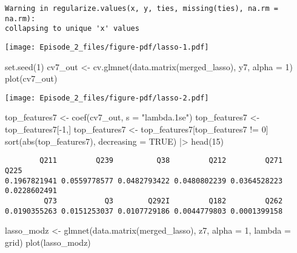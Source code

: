 \documentclass[
  letterpaper,
  DIV=11,
  numbers=noendperiod]{scrartcl}
\newenvironment{Shaded}{\begin{snugshade}}{\end{snugshade}}
\newcommand{\AttributeTok}[1]{\textcolor[rgb]{0.40,0.45,0.13}{#1}}
\newcommand{\ConstantTok}[1]{\textcolor[rgb]{0.56,0.35,0.01}{#1}}
\newcommand{\DecValTok}[1]{\textcolor[rgb]{0.68,0.00,0.00}{#1}}
\newcommand{\FunctionTok}[1]{\textcolor[rgb]{0.28,0.35,0.67}{#1}}
\newcommand{\NormalTok}[1]{\textcolor[rgb]{0.00,0.23,0.31}{#1}}
\newcommand{\OtherTok}[1]{\textcolor[rgb]{0.00,0.23,0.31}{#1}}
\newcommand{\SpecialCharTok}[1]{\textcolor[rgb]{0.37,0.37,0.37}{#1}}
\newcommand{\StringTok}[1]{\textcolor[rgb]{0.13,0.47,0.30}{#1}}
\begin{document}
\begin{verbatim}
Warning in regularize.values(x, y, ties, missing(ties), na.rm = na.rm):
collapsing to unique 'x' values
\end{verbatim}

\texttt{[image: Episode\_2\_files/figure-pdf/lasso-1.pdf]}

\begin{Shaded}
\begin{Highlighting}[]
\FunctionTok{set.seed}\NormalTok{(}\DecValTok{1}\NormalTok{)}
\NormalTok{cv7\_out }\OtherTok{\textless{}{-}} \FunctionTok{cv.glmnet}\NormalTok{(}\FunctionTok{data.matrix}\NormalTok{(merged\_lasso), y7, }\AttributeTok{alpha =} \DecValTok{1}\NormalTok{)}
\FunctionTok{plot}\NormalTok{(cv7\_out)}
\end{Highlighting}
\end{Shaded}

\texttt{[image: Episode\_2\_files/figure-pdf/lasso-2.pdf]}

\begin{Shaded}
\begin{Highlighting}[]
\NormalTok{top\_features7 }\OtherTok{\textless{}{-}} \FunctionTok{coef}\NormalTok{(cv7\_out, }\AttributeTok{s =} \StringTok{"lambda.1se"}\NormalTok{)}
\NormalTok{top\_features7 }\OtherTok{\textless{}{-}}\NormalTok{ top\_features7[}\SpecialCharTok{{-}}\DecValTok{1}\NormalTok{,]}
\NormalTok{top\_features7 }\OtherTok{\textless{}{-}}\NormalTok{ top\_features7[top\_features7 }\SpecialCharTok{!=} \DecValTok{0}\NormalTok{]}
\FunctionTok{sort}\NormalTok{(}\FunctionTok{abs}\NormalTok{(top\_features7), }\AttributeTok{decreasing =} \ConstantTok{TRUE}\NormalTok{) }\SpecialCharTok{|\textgreater{}} \FunctionTok{head}\NormalTok{(}\DecValTok{15}\NormalTok{)}
\end{Highlighting}
\end{Shaded}

\begin{verbatim}
        Q211         Q239          Q38         Q212         Q271         Q225 
0.1967821941 0.0559778577 0.0482793422 0.0480802239 0.0364528223 0.0228602491 
         Q73           Q3        Q292I         Q182         Q262 
0.0190355263 0.0151253037 0.0107729186 0.0044779803 0.0001399158 
\end{verbatim}

\begin{Shaded}
\begin{Highlighting}[]
\NormalTok{lasso\_modz }\OtherTok{\textless{}{-}} \FunctionTok{glmnet}\NormalTok{(}\FunctionTok{data.matrix}\NormalTok{(merged\_lasso), z7, }\AttributeTok{alpha =} \DecValTok{1}\NormalTok{, }\AttributeTok{lambda =}\NormalTok{ grid)}
\FunctionTok{plot}\NormalTok{(lasso\_modz)}
\end{Highlighting}
\end{Shaded}
\end{document}
